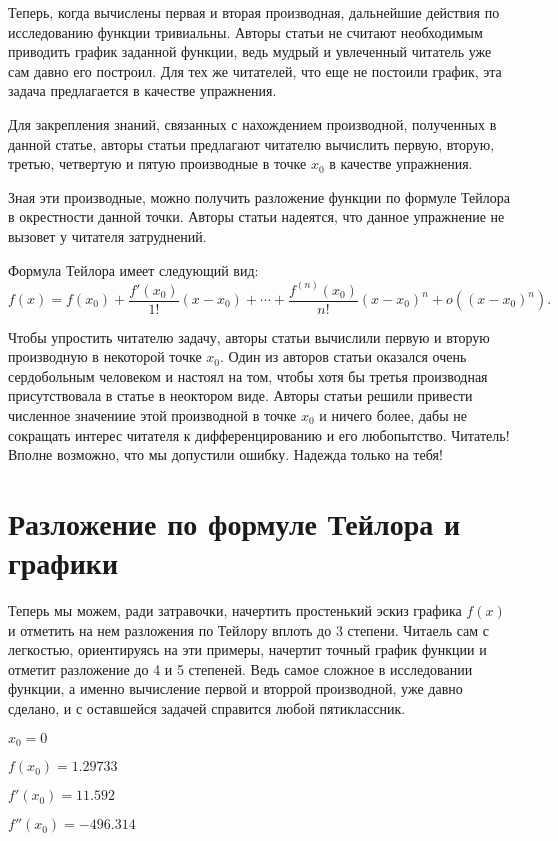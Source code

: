 \documentclass{article}
\begin{document}
Теперь, когда вычислены первая и вторая производная, дальнейшие действия по исследованию функции тривиальны. Авторы статьи не считают необходимым приводить график заданной функции, ведь мудрый и увлеченный читатель уже сам давно его построил. Для тех же читателей, что еще не постоили график, эта задача предлагается в качестве упражнения.

Для закрепления знаний, связанных с нахождением производной, полученных в данной статье, авторы статьи предлагают читателю вычислить первую, вторую, третью, четвертую и пятую производные в точке $x_0$ в качестве упражнения.

Зная эти производные, можно получить разложение функции по формуле Тейлора в окрестности данной точки. Авторы статьи надеятся, что данное упражнение не вызовет у читателя затруднений.

Формула Тейлора имеет следующий вид:
$$f(x) = f(x_0) + \frac{f'(x_0)}{1!}(x - x_0) + \cdots + \frac{f^{(n)}(x_0)}{n!}(x - x_0)^n + o((x - x_0)^n).$$

Чтобы упростить читателю задачу, авторы статьи вычислили первую и вторую производную в некоторой точке $x_0$. Один из авторов статьи оказался очень сердобольным человеком и настоял на том, чтобы хотя бы третья производная присутствовала в статье в неоктором виде. Авторы статьи решили привести численное значениие этой производной в точке $x_0$ и ничего более, дабы не сокращать интерес читателя к дифференцированию и его любопытство. Читатель! Вполне возможно, что мы допустили ошибку. Надежда только на тебя!

\section{Разложение по формуле Тейлора и графики}

Теперь мы можем, ради затравочки, начертить простенький эскиз графика $f(x)$ и отметить на нем разложения по Тейлору вплоть до 3 степени. Читаель сам с легкостью, ориентируясь на эти примеры, начертит точный график функции и отметит разложение до 4 и 5 степеней. Ведь самое сложное в исследовании функции, а именно вычисление первой и вторрой производной, уже давно сделано, и с оставшейся задачей справится любой пятиклассник.



$x_0 = 0$

$f(x_0) = 1.29733$

$f'(x_0) = 11.592$

$f''(x_0) = -496.314$
\end{document}

